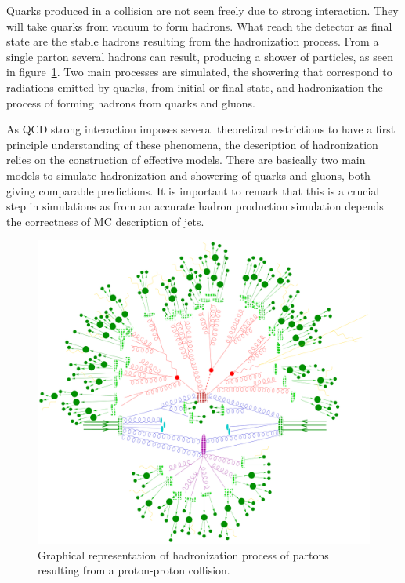 Quarks produced in a collision are not seen freely due to strong interaction. They will take quarks from vacuum to form hadrons. What reach the detector as final state are the stable hadrons resulting from the hadronization process. From a single parton several hadrons can result, producing a shower of particles, as seen in figure~\ref{fig:Hadr}. Two main processes are simulated, the showering that correspond to radiations emitted by quarks, from initial or final state, and hadronization the process of forming hadrons from quarks and gluons. 

As QCD strong interaction imposes several theoretical restrictions to have a first principle understanding of these phenomena, the description of hadronization relies on the construction of effective models. There are basically two main models to simulate hadronization and showering of quarks and gluons, both giving comparable predictions. It is important to remark that this is a crucial step in simulations as from an accurate hadron production simulation depends the correctness of MC description of jets.

\begin{figure}[!Hhtbp]
  \begin{center}
    \includegraphics[width=\textwidth]{figs/parton_shower.png}
    \caption{Graphical representation of hadronization process of partons resulting from a proton-proton collision.}
    \label{fig:Hadr}
  \end{center}
\end{figure}

